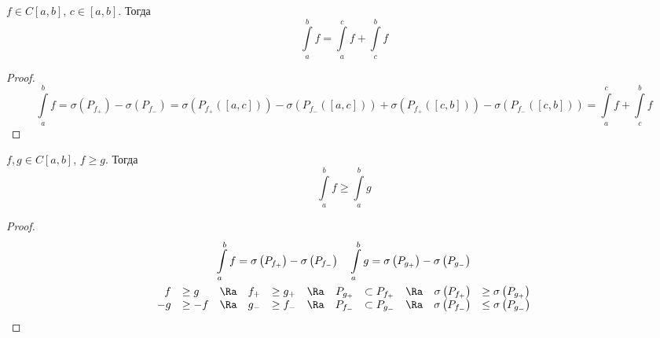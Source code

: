 \begin{theorem}
	$f \in C[a, b]$, $c \in [a, b]$.
	Тогда
	\[ \int\limits_a^b f = \int\limits_a^c f + \int\limits_c^b f \]
\end{theorem}
\begin{proof}
	\[
		\int\limits_a^b f = \sigma\left(P_{f_+}\right) - \sigma\left(P_{f_-}\right) =
			\sigma\left(P_{f_+}([a, c])\right) - \sigma \left(P_{f_-}([a, c])\right) + \sigma \left(P_{f_+}([c, b])\right) - \sigma \left(P_{f_-}([c, b])\right) =
			\int\limits_a^c f + \int\limits_c^b f
	\]
\end{proof}

\begin{theorem}
	$f, g \in C[a, b]$, $f \ge g$.
	Тогда
	\[ \int\limits_a^b f \ge \int\limits_a^b g \]
\end{theorem}
\begin{proof}
	\begin{gather*}
		\int\limits_a^b f = \sigma\left(P_{f_+}\right) - \sigma\left(P_{f_-}\right) \quad
		\int\limits_a^b g = \sigma\left(P_{g_+}\right) - \sigma\left(P_{g_-}\right) \\
		\begin{array}{rlcrlcrlcrl}
			 f &\ge  g &\Ra& f_+ &\ge g_+ &\Ra& P_{g_+} &\subset P_{f_+} &\Ra& \sigma\left(P_{f_+}\right) &\ge \sigma\left(P_{g_+}\right) \\
			-g &\ge -f &\Ra& g_- &\ge f_- &\Ra& P_{f_-} &\subset P_{g_-} &\Ra& \sigma\left(P_{f_-}\right) &\le \sigma\left(P_{g_-}\right)
		\end{array}
	\end{gather*}
\end{proof}
